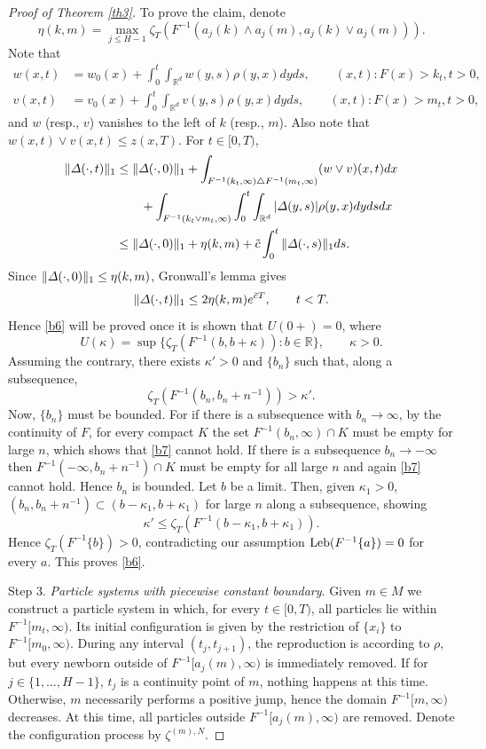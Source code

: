 \documentclass[11pt]{amsart}
\theoremstyle{plain}
\newcommand{\kap}{\kappa}
\newcommand{\Del}{\mathnormal{\Delta}}
\newcommand{\R}{{\mathbb R}}
\newcommand{\w}{\wedge}
\newcommand{\iy}{\infty}
\newcommand{\leb}{\text{\rm Leb}}
\begin{document}
\begin{proof}[Proof of Theorem \ref{th3}]
To prove the claim, denote
\[
\eta(k,m)=\max_{j\le H-1}\zeta_T(F^{-1}(a_j(k)\w a_j(m),a_j(k)\vee a_j(m))).
\]
Note that
\begin{align}\label{b8}
w(x,t)&=w_0(x)+\int_0^t\int_{\R^d}w(y,s)\rho(y,x)dyds,
\qquad (x,t):F(x)>k_t,t>0,
\\
\label{b9}
v(x,t)&=v_0(x)+\int_0^t\int_{\R^d}v(y,s)\rho(y,x)dyds,
\qquad (x,t):F(x)>m_t,t>0,
\end{align}
and $w$ (resp., $v$) vanishes to the left of $k$ (resp., $m$).
Also note that $w(x,t)\vee v(x,t)\le z(x,T)$. For $t\in[0,T)$,
\begin{align*}
\|\Del(\cdot,t)\|_1 &\le
\|\Del(\cdot,0)\|_1
+\int_{F^{-1}(k_t,\iy)\triangle F^{-1}(m_t,\iy)}(w\vee v)(x,t)dx
\\
&\qquad
+\int_{F^{-1}(k_t\vee m_t,\iy)}\int_0^t\int_{\R^d}
|\Del(y,s)|\rho(y,x)dydsdx
\\
&\le\|\Del(\cdot,0)\|_1+\eta(k,m)+\tilde c\int_0^t\|\Del(\cdot,s)\|_1ds.
\end{align*}
Since $\|\Del(\cdot,0)\|_1\le\eta(k,m)$, Gronwall's lemma gives
\[
\|\Del(\cdot,t)\|_1\le 2\eta(k,m)e^{\tilde cT},
\qquad t<T.
\]
Hence \eqref{b6} will be proved once it is shown that
$U(0+)=0$, where
\[
U(\kap)=\sup\{\zeta_T(F^{-1}(b,b+\kap)):b\in\R\}, \qquad \kap>0.
\]
Assuming the contrary, there exists $\kap'>0$ and
$\{b_n\}$ such that, along a subsequence,
\begin{equation}\label{b7}
\zeta_T(F^{-1}(b_n,b_n+n^{-1}))>\kap'.
\end{equation}
Now, $\{b_n\}$ must be bounded. For if there is a subsequence with $b_n\to\iy$,
by the continuity of $F$, for every compact $K$
the set $F^{-1}(b_n,\iy)\cap K$ must be empty for large $n$,
which shows that \eqref{b7} cannot hold.
If there is a subsequence $b_n\to-\iy$ then
$F^{-1}(-\iy,b_n+n^{-1})\cap K$ must be empty for all large $n$
and again \eqref{b7} cannot hold.
Hence $b_n$ is bounded. Let $b$ be a limit.
Then, given $\kap_1>0$, $(b_n,b_n+n^{-1})\subset(b-\kap_1,b+\kap_1)$
for large $n$ along a subsequence, showing
\[
\kap' \le \zeta_T(F^{-1}(b-\kap_1,b+\kap_1)).
\]
Hence $\zeta_T(F^{-1}\{b\})>0$, contradicting our assumption
$\leb(F^{-1}\{a\})=0$ for every $a$. This proves \eqref{b6}.

Step 3. {\it Particle systems with piecewise constant boundary}.
Given $m\in M$ we construct a particle system
in which, for every $t\in[0,T)$, all particles lie within $F^{-1}[m_t,\iy)$.
Its initial configuration is given by the restriction of $\{x_i\}$
to $F^{-1}[m_0,\iy)$. During any interval $(t_j,t_{j+1})$,
the reproduction is according to $\rho$, but every newborn outside of
$F^{-1}[a_j(m),\iy)$ is immediately removed.
If for $j\in\{1,\ldots,H-1\}$, $t_j$ is a continuity point of $m$,
nothing happens at this time. Otherwise,
$m$ necessarily performs a positive jump,
hence the domain $F^{-1}[m,\iy)$
decreases. At this time, all particles outside $F^{-1}[a_j(m),\iy)$
are removed.
Denote the configuration process by $\zeta^{(m),N}$.


\end{proof}
\end{document}
